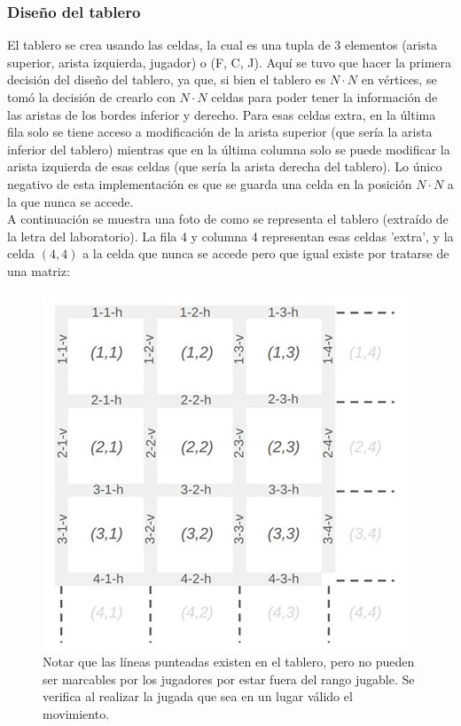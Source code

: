 \documentclass[12pt]{article} %
\begin{document}
			\subsubsection{Diseño del tablero}
			El tablero se crea usando las celdas, la cual es una tupla de 3 elementos (arista superior, arista izquierda, jugador) o (F, C, J). Aquí se tuvo que hacer la primera decisión del diseño del tablero, ya que, si bien el tablero es $N\cdot N$ en vértices, se tomó la decisión de crearlo con $N\cdot N$ celdas para poder tener la información de las aristas de los bordes inferior y derecho. Para esas celdas extra, en la última fila solo se tiene acceso a modificación de la arista superior (que sería la arista inferior del tablero) mientras que en la última columna solo se puede modificar la arista izquierda de esas celdas (que sería la arista derecha del tablero). Lo único negativo de esta implementación es que se guarda una celda en la posición $N\cdot N$ a la que nunca se accede. \\
			
			A continuación se muestra una foto de como se representa el tablero (extraído de la letra del laboratorio). La fila 4 y columna 4 representan esas celdas 'extra', y la celda $(4,4)$ a la celda que nunca se accede pero que igual existe por tratarse de una matriz:
			
			\begin{figure}[h!]
				\centering
				\includegraphics[width=0.7\linewidth]{disTablero}
				\caption{Notar que las líneas punteadas existen en el tablero, pero no pueden ser marcables por los jugadores por estar fuera del rango jugable. Se verifica al realizar la jugada que sea en un lugar válido el movimiento.}
			\end{figure}
			
\end{document}
